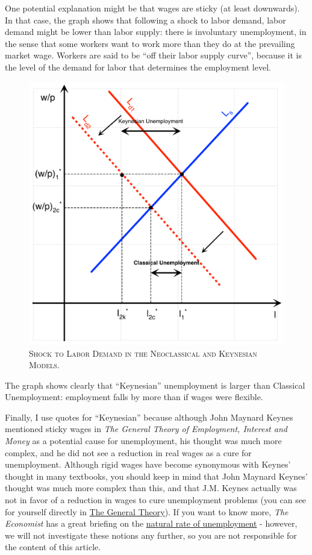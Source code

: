 \documentclass[]{book}
\theoremstyle{definition}
\theoremstyle{definition}
\theoremstyle{definition}
\theoremstyle{remark}
\begin{document}
One potential explanation might be that wages are sticky (at least
downwards). In that case, the graph shows that following a shock to
labor demand, labor demand might be lower than labor supply: there is
involuntary unemployment, in the sense that some workers want to work
more than they do at the prevailing market wage. Workers are said to be
``off their labor supply curve'', because it is the level of the demand
for labor that determines the employment level.




\begin{figure}

{\centering \includegraphics[width=0.75\linewidth,height=1\textheight]{graphsketcher/labor-market-productivity-shock-keynes} 

}

\caption{\textsc{Shock to Labor Demand in the
Neoclassical and Keynesian Models}.}\label{fig:shock-labor-demand}
\end{figure}

The graph shows clearly that ``Keynesian'' unemployment is larger than
Classical Unemployment: employment falls by more than if wages were
flexible.

Finally, I use quotes for ``Keynesian'' because although John Maynard
Keynes mentioned sticky wages in \emph{The General Theory of Employment,
Interest and Money} as a potential cause for unemployment, his thought
was much more complex, and he did not see a reduction in real wages as a
cure for unemployment. Although rigid wages have become synonymous with
Keynes' thought in many textbooks, you should keep in mind that John
Maynard Keynes' thought was much more complex than this, and that J.M.
Keynes actually was not in favor of a reduction in wages to cure
unemployment problems (you can see for yourself directly in
\href{http://cas2.umkc.edu/economics/people/facultypages/kregel/courses/econ645/winter2011/generaltheory.pdf}{The
General Theory}). If you want to know more, \emph{The Economist} has a
great briefing on the
\href{https://www.economist.com/economics-brief/2017/08/26/the-natural-rate-of-unemployment}{natural
rate of unemployment} - however, we will not investigate these notions
any further, so you are not responsible for the content of this article.
\end{document}
